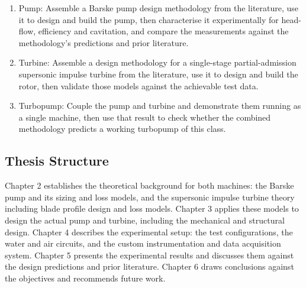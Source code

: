 \begin{enumerate}
    \item Pump: Assemble a Barske pump design methodology from the literature, use it to design and build the pump, then characterise it experimentally for head-flow, efficiency and cavitation, and compare the measurements against the methodology's predictions and prior literature.
    \item Turbine: Assemble a design methodology for a single-stage partial-admission supersonic impulse turbine from the literature, use it to design and build the rotor, then validate those models against the achievable test data.
    \item Turbopump: Couple the pump and turbine and demonstrate them running as a single machine, then use that result to check whether the combined methodology predicts a working turbopump of this class.
\end{enumerate}

\subsection{Thesis Structure}

Chapter 2 establishes the theoretical background for both machines: the Barske pump and its sizing and loss models, and the supersonic impulse turbine theory including blade profile design and loss models. Chapter 3 applies these models to design the actual pump and turbine, including the mechanical and structural design. Chapter 4 describes the experimental setup: the test configurations, the water and air circuits, and the custom instrumentation and data acquisition system. Chapter 5 presents the experimental results and discusses them against the design predictions and prior literature. Chapter 6 draws conclusions against the objectives and recommends future work.
